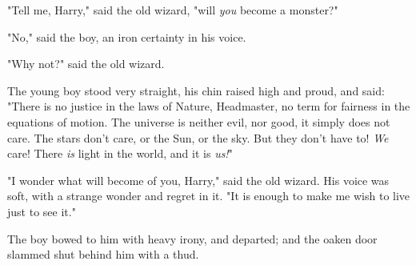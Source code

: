 "Tell me, Harry," said the old wizard, "will \emph{you} become a monster?"

"No," said the boy, an iron certainty in his voice.

"Why not?" said the old wizard.

The young boy stood very straight, his chin raised high and proud, and said:
"There is no justice in the laws of Nature, Headmaster, no term for fairness in
the equations of motion. The universe is neither evil, nor good, it simply does
not care. The stars don't care, or the Sun, or the sky. But they don't have to!
\emph{We} care! There \emph{is} light in the world, and it is \emph{us!}"

"I wonder what will become of you, Harry," said the old wizard. His voice was
soft, with a strange wonder and regret in it. "It is enough to make me wish to
live just to see it."

The boy bowed to him with heavy irony, and departed; and the oaken door slammed
shut behind him with a thud.
